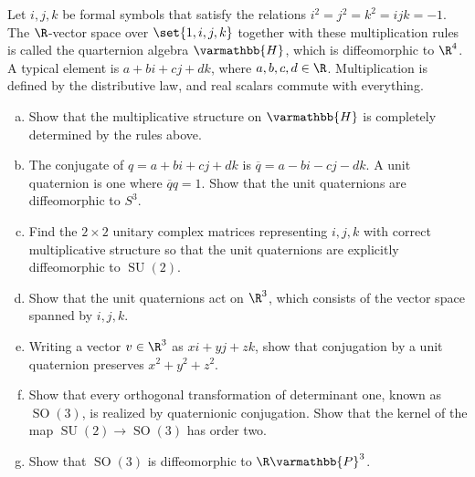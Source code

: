 \documentclass[10pt]{mypackage}
\renewcommand*{\mathbb}[1]{\varmathbb{#1}}
\begin{document}
\begin{problem}
  Let $i,j,k$ be formal symbols that satisfy the relations $i^2 = j^2 = k^2 = ijk = -1$. The $\R$-vector space over $\set{1,i,j,k}$ together with these multiplication rules is called the quarternion algebra $ \mathbb{H} $, which is diffeomorphic to $\R^{4}$. A typical element is $a + bi + cj + dk$, where $a,b,c,d\in \R$. Multiplication is defined by the distributive law, and real scalars commute with everything.
  \begin{enumerate}[(a)]
    \item Show that the multiplicative structure on $ \mathbb{H} $ is completely determined by the rules above.
    \item The conjugate of $q = a + bi + cj + dk$ is $ \overline{q} = a - bi - cj - dk $. A unit quaternion is one where $ \overline{q} q = 1 $. Show that the unit quaternions are diffeomorphic to $S^{3}$.
    \item Find the $ 2\times 2 $ unitary complex matrices representing $i,j,k$ with correct multiplicative structure so that the unit quaternions are explicitly diffeomorphic to $\operatorname{SU}(2)$.
    \item Show that the unit quaternions act on $\R^{3}$, which consists of the vector space spanned by $i,j,k$.
    \item Writing a vector $ v\in \R^{3} $ as $ xi + yj + zk $, show that conjugation by a unit quaternion preserves $x^2 + y^2 + z^2$.
    \item Show that every orthogonal transformation of determinant one, known as $ \operatorname{SO}(3) $, is realized by quaternionic conjugation. Show that the kernel of the map $ \operatorname{SU}(2)\rightarrow \operatorname{SO}(3) $ has order two.
    \item Show that $ \operatorname{SO}(3) $ is diffeomorphic to $ \R \mathbb{P}^{3} $.
  \end{enumerate}
\end{problem}
\end{document}
